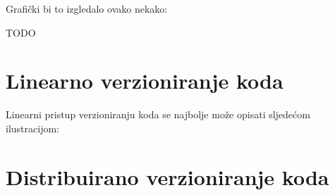 Grafički bi to izgledalo ovako nekako:

TODO



\section*{Linearno verzioniranje koda}

Linearni pristup verzioniranju koda se najbolje može opisati sljedećom ilustracijom:



\section*{Distribuirano verzioniranje koda}

